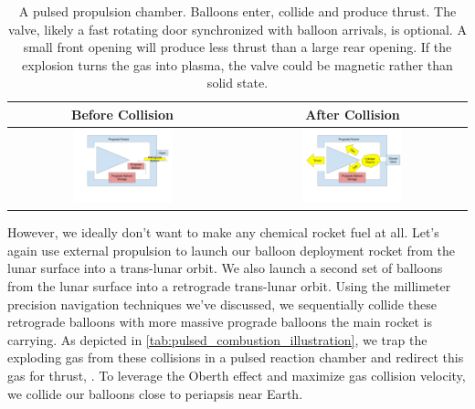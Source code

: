 \documentclass{article}
\begin{document}
{\begin{table}[htpb!]
    \centering
    \begin{tabular}{|c|c|}
        \hline
        Before Collision & After Collision \\\hline
        \includegraphics[width=0.45\textwidth]{images/Pulsed Propulsion Chamber Before Impact.png} &
        \includegraphics[width=0.45\textwidth]{images/_Pulsed Propulsion Chamber After Impact.png} \\ \hline
         
    \end{tabular}
    \caption{A pulsed propulsion chamber.   Balloons enter, collide and produce thrust.   The valve, likely a fast rotating door synchronized with balloon arrivals, is optional. A small front opening will produce less thrust than a large rear opening.  If the explosion turns the gas into plasma, the valve could be magnetic rather than solid state.}
    \label{tab:pulsed_combustion_illustration}
\end{table}

However, we ideally don't want to make any chemical rocket fuel at all.   Let's again use external propulsion to launch our balloon deployment rocket from the lunar surface into a trans-lunar orbit.   We also launch a second set of balloons from the lunar surface into a retrograde trans-lunar orbit.   Using the millimeter precision navigation techniques we've discussed, we sequentially collide these retrograde balloons with more massive prograde balloons the main rocket is carrying.  As depicted in \autoref{tab:pulsed_combustion_illustration}, we trap the exploding gas from these collisions in a pulsed reaction chamber and redirect this gas for thrust, .   To leverage the Oberth effect and maximize gas collision velocity, we collide our balloons close to periapsis near Earth.

}
\end{document}
